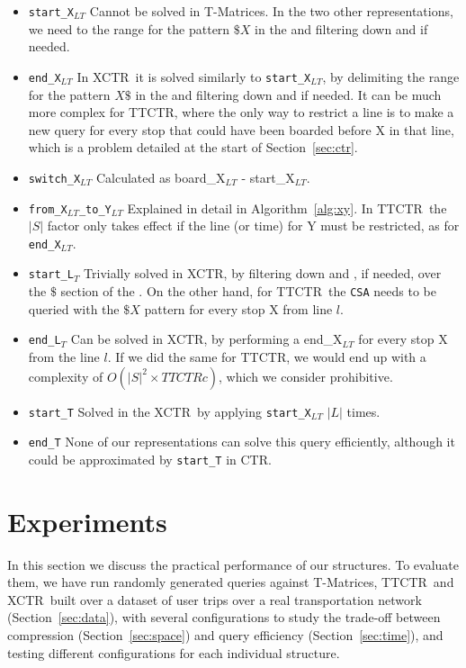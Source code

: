 \documentclass[runningheads]{llncs}
\newcommand{\acumm}{T-Matrices} %
\newcommand{\ctr}{XCTR}
\newcommand{\ttctr}{TTCTR}
\newcommand{\ttctrq}{TTCTRc}
\begin{document}
\begin{itemize}
    \item \texttt{start\_X$_{LT}$} Cannot be solved in \acumm. In the two other representations, we need to the range for the pattern $\$X$ in the  and filtering down  and  if needed.
    \item \texttt{end\_X$_{LT}$} In \ctr~it is solved similarly to \texttt{start\_X$_{LT}$}, by delimiting the range for the pattern $X\$$ in the  and filtering down  and  if needed. It can be much more complex for \ttctr, where the only way to restrict a line is to make a new query for every stop that could have been boarded before X in that line, which is a problem detailed at the start of Section~\ref{sec:ctr}.
    \item \texttt{switch\_X$_{LT}$} Calculated as board\_X$_{LT}$ - start\_X$_{LT}$.
    \item \texttt{from\_X$_{LT}$\_to\_Y$_{LT}$} Explained in detail in Algorithm~\ref{alg:xy}. In \ttctr~the $|S|$ factor only takes effect if the line (or time) for Y must be restricted, as for \texttt{end\_X$_{LT}$}.
    \item \texttt{start\_L$_T$} Trivially solved in \ctr, by filtering down  and , if needed, over the $\$$ section of the . On the other hand, for \ttctr~the \texttt{CSA} needs to be queried with the $\$X$ pattern for every stop X from line $l$.
    \item \texttt{end\_L$_T$} Can be solved in \ctr, by performing a end\_X$_{LT}$ for every stop X from the line $l$. If we did the same for \ttctr, we would end up with a complexity of $O(|S|^2\times\ttctrq)$, which we consider prohibitive.
    \item \texttt{start\_T} Solved in the \ctr~by applying \texttt{start\_X$_{LT}$} $|L|$ times.
    \item \texttt{end\_T} None of our representations can solve this query efficiently, although it could be approximated by \texttt{start\_T} in CTR.
\end{itemize}

\section{Experiments}
\label{sec:exp}
In this section we discuss the practical performance of our structures. To evaluate them, we have run randomly generated queries against \acumm, \ttctr~and \ctr~built over a dataset of user trips over a real transportation network (Section~\ref{sec:data}), with several configurations to study the trade-off between compression (Section~\ref{sec:space}) and query efficiency (Section~\ref{sec:time}), and testing different configurations for each individual structure.
\end{document}

